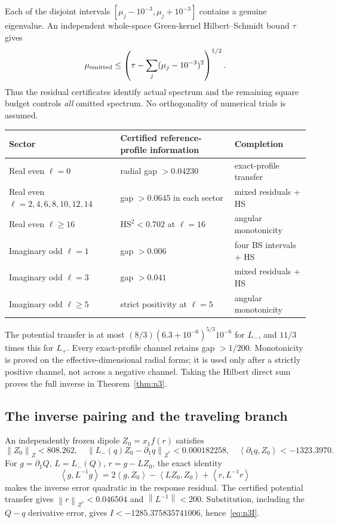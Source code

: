\documentclass[11pt,a4paper]{article}
\theoremstyle{remark}\newtheorem{remark}[theorem]{Remark}
\newcommand{\norm}[1]{\left\|#1\right\|}
\newcommand{\ip}[2]{\left\langle #1,#2\right\rangle}
\begin{document}
Each of the disjoint intervals $[\mu_j-10^{-3},\mu_j+10^{-3}]$ contains a genuine eigenvalue. An independent whole-space Green-kernel Hilbert--Schmidt bound $\tau$ gives
\[
 \mu_{\rm omitted}\le
 \left(\tau-\sum_j(\mu_j-10^{-3})^2\right)^{1/2}.
\]
Thus the residual certificates identify actual spectrum and the remaining square budget controls \emph{all} omitted spectrum. No orthogonality of numerical trials is assumed.

\begin{center}
\small
\begin{tabular}{@{}lll@{}}\toprule
Sector & Certified reference-profile information & Completion \\\midrule
Real even $\ell=0$ & radial gap $>0.04230$ & exact-profile transfer \\
Real even $\ell=2,4,6,8,10,12,14$ & gap $>0.0645$ in each sector & mixed residuals + HS \\
Real even $\ell\ge16$ & $\mathrm{HS}^2<0.702$ at $\ell=16$ & angular monotonicity \\
Imaginary odd $\ell=1$ & gap $>0.006$ & four BS intervals + HS \\
Imaginary odd $\ell=3$ & gap $>0.041$ & mixed residuals + HS \\
Imaginary odd $\ell\ge5$ & strict positivity at $\ell=5$ & angular monotonicity \\\bottomrule
\end{tabular}
\end{center}
The potential transfer is at most
$(8/3)(6.3+10^{-6})^{5/3}10^{-6}$ for $L_-$, and $11/3$ times this for $L_+$. Every exact-profile channel retains gap $>1/200$. Monotonicity is proved on the effective-dimensional radial forms; it is used only after a strictly positive channel, not across a negative channel. Taking the Hilbert direct sum proves the full inverse in Theorem~\ref{thm:n3}.

\subsection{The inverse pairing and the traveling branch}
An independently frozen dipole $Z_0=x_1f(r)$ satisfies
\[
 \norm{Z_0}_Z<808.262,\quad
 \norm{L_-(q)Z_0-\partial_1q}_{Z^*}<0.000182258,
 \quad\ip{\partial_1q}{Z_0}<-1323.3970.
\]
For $g=\partial_1Q$, $L=L_-(Q)$, $r=g-LZ_0$, the exact identity
\begin{equation}\label{eq:quadraticresponse}
 \ip g{L^{-1}g}
 =2\ip g{Z_0}-\ip{LZ_0}{Z_0}+\ip r{L^{-1}r}
\end{equation}
makes the inverse error quadratic in the response residual. The certified potential transfer gives $\norm r_{Z^*}<0.046504$ and $\norm{L^{-1}}<200$. Substitution, including the $Q-q$ derivative error, gives
$I<-1285.375835741006$, hence~\eqref{eq:n3I}.
\end{document}
